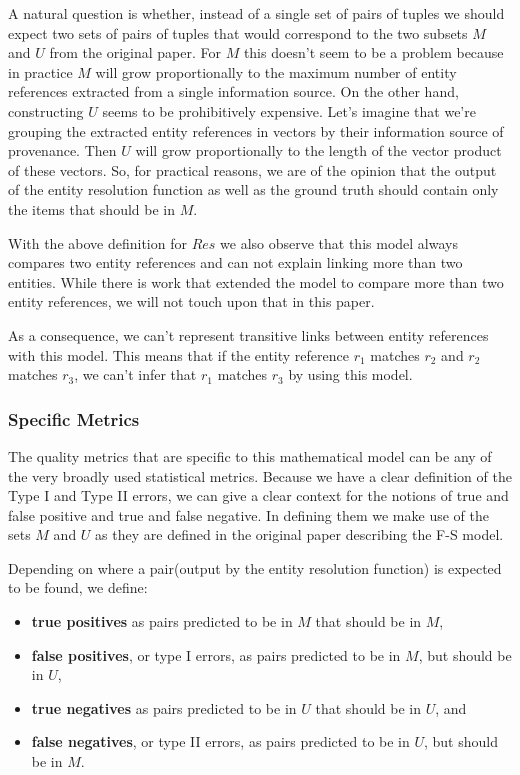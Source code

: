 \documentclass[lettersize,journal]{IEEEtran}
\begin{document}
    A natural question is whether, instead of a single set of pairs of tuples we
    should expect two sets of pairs of tuples that would correspond to the two
    subsets $M$ and $U$ from the original paper.
    For $M$ this doesn't seem to be a problem because in practice $M$ will grow
    proportionally to the maximum number of entity references extracted from a
    single information source.
    On the other hand, constructing $U$ seems to be prohibitively expensive.
    Let's imagine that we're grouping the extracted entity references in vectors
    by their information source of provenance.
    Then $U$ will grow proportionally to the length of the vector product of
    these vectors.
    So, for practical reasons, we are of the opinion that the output of the
    entity resolution function as well as the ground truth should contain only
    the items that should be in $M$.

    With the above definition for $Res$ we also observe that this model always
    compares two entity references and can not explain linking more than two
    entities\cite{Tal11}.
    While there is work that extended the model to compare more than two 
    entity references\cite{Kon19}, we will not touch upon that in this paper.
    
    As a consequence, we can't represent transitive links between entity
    references with this model.
    This means that if the entity reference $r_1$ matches $r_2$ and
    $r_2$ matches $r_3$, we can't infer that $r_1$ matches $r_3$ by using this
    model\cite{Tal11}.

    \subsubsection[fms-measure]{Specific Metrics}\label{subsubsec:fsm-measure}

    The quality metrics that are specific to this mathematical model can be any
    of the very broadly used statistical metrics.
    Because we have a clear definition of the Type I and Type II errors, we can
    give a clear context for the notions of true and false positive and true and
    false negative.
    In defining them we make use of the sets $M$ and $U$ as they are defined in
    the original paper describing the F-S model.

    Depending on where a pair(output by the entity resolution function) is
    expected to be found, we define:

    \begin{itemize}
        \item \textbf{true positives} as pairs predicted to be in $M$ that
        should be in $M$,
        \item \textbf{false positives}, or type I errors, as pairs predicted to
        be in $M$, but should be in $U$,
        \item \textbf{true negatives} as pairs predicted to be in $U$ that
        should be in $U$, and
        \item \textbf{false negatives}, or type II errors, as pairs predicted to
        be in $U$, but should be in $M$.
    \end{itemize}
\end{document}
